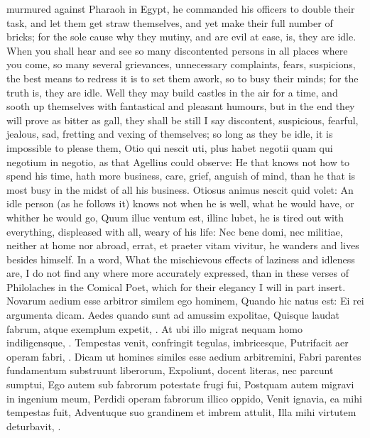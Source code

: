 {murmured against Pharaoh in Egypt, he commanded his officers to double
their task, and let them get straw themselves, and yet make their full
number of bricks; for the sole cause why they mutiny, and are evil at
ease, is, they are idle. When you shall hear and see so many
discontented persons in all places where you come, so many several
grievances, unnecessary complaints, fears, suspicions, the best
means to redress it is to set them awork, so to busy their minds; for
the truth is, they are idle. Well they may build castles in the air for
a time, and sooth up themselves with fantastical and pleasant humours,
but in the end they will prove as bitter as gall, they shall be still I
say discontent, suspicious, fearful, jealous, sad, fretting and
vexing of themselves; so long as they be idle, it is impossible to
please them, Otio qui nescit uti, plus habet negotii quam qui negotium
in negotio, as that Agellius could observe: He that knows not how
to spend his time, hath more business, care, grief, anguish of mind,
than he that is most busy in the midst of all his business. Otiosus
animus nescit quid volet: An idle person (as he follows it) knows not
when he is well, what he would have, or whither he would go, Quum illuc
ventum est, illinc lubet, he is tired out with everything, displeased
with all, weary of his life: Nec bene domi, nec militiae, neither at
home nor abroad, errat, et praeter vitam vivitur, he wanders and lives
besides himself. In a word, What the mischievous effects of laziness
and idleness are, I do not find any where more accurately expressed,
than in these verses of Philolaches in the Comical Poet, which
for their elegancy I will in part insert.
Novarum aedium esse arbitror similem ego hominem,
Quando hic natus est: Ei rei argumenta dicam.
Aedes quando sunt ad amussim expolitae,
Quisque laudat fabrum, atque exemplum expetit, \etc{}.
At ubi illo migrat nequam homo indiligensque, \etc{}.
Tempestas venit, confringit tegulas, imbricesque,
Putrifacit aer operam fabri, \etc{}.
Dicam ut homines similes esse aedium arbitremini,
Fabri parentes fundamentum substruunt liberorum,
Expoliunt, docent literas, nec parcunt sumptui,
Ego autem sub fabrorum potestate frugi fui,
Postquam autem migravi in ingenium meum,
Perdidi operam fabrorum illico oppido,
Venit ignavia, ea mihi tempestas fuit,
Adventuque suo grandinem et imbrem attulit,
Illa mihi virtutem deturbavit, \etc{}.

}
